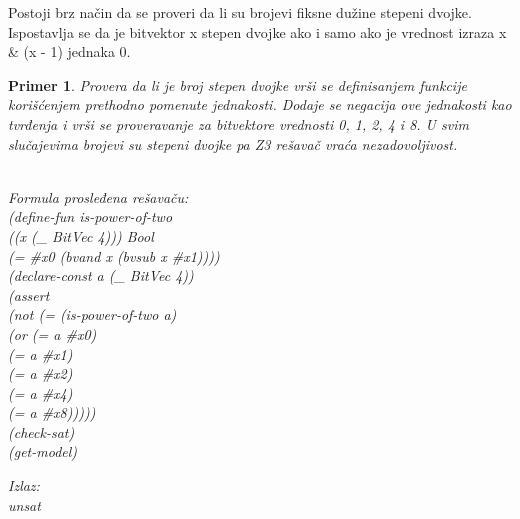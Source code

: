\documentclass[12pt,oneside]{memoir}
\newtheorem{primer}{Primer}
\begin{document}
Postoji brz način da se proveri da li su brojevi fiksne dužine stepeni dvojke. 
Ispostavlja se da je bitvektor x stepen dvojke ako i samo ako je vrednost izraza
x \& (x - 1) jednaka 0.
\begin{primer} Provera da li je broj stepen dvojke vrši se definisanjem funkcije korišćenjem prethodno pomenute jednakosti. Dodaje se negacija ove jednakosti kao tvrđenja i vrši se proveravanje za bitvektore vrednosti 0, 1, 2, 4 i 8. U svim slučajevima brojevi su stepeni dvojke pa Z3 rešavač vraća nezadovoljivost.\\ \\
\begin{minipage}[b]{0.5\textwidth}
Formula prosleđena rešavaču:
\\(define-fun is-power-of-two 
\\((x (\_ BitVec 4))) Bool 
\\(= \#x0 (bvand x (bvsub x \#x1))))
\\(declare-const a (\_ BitVec 4))
\\(assert 
\\ (not (= (is-power-of-two a) 
\\         (or (= a \#x0) 
\\             (= a \#x1) 
\\             (= a \#x2) 
\\             (= a \#x4) 
\\             (= a \#x8)))))
\\(check-sat)
\\(get-model)
\end{minipage}
\hspace{2.5cm}
\begin{minipage}[t]{0.5\textwidth}
\vspace{-8.35cm}
Izlaz:
\\unsat
\end{minipage}
\end{primer}
\vspace{0.5cm}
\end{document}
